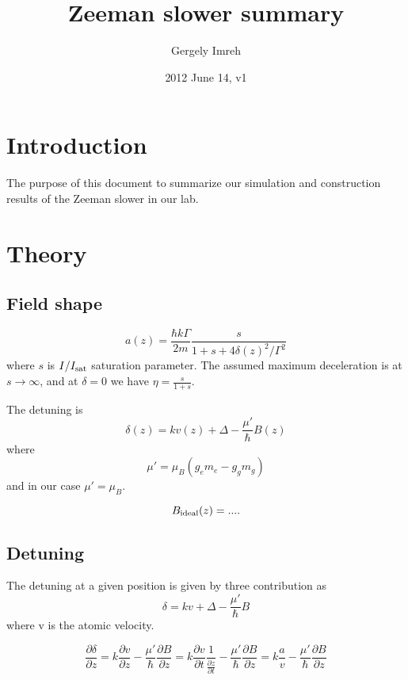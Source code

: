 \documentclass[12pt,a4paper]{article}
\author{Gergely Imreh}
\title{Zeeman slower summary}
\date{2012 June 14, v1}
\begin{document}
\maketitle

\section{Introduction}

The purpose of this document to summarize our simulation and construction results of the Zeeman slower in our lab.

\section{Theory}

\subsection{Field shape}

\begin{equation}
a(z) = \frac{\hbar k \Gamma}{2 m} \frac{s}{1 + s + 4 \delta(z)^2 / \Gamma^2}
\label{eq:accel}
\end{equation}
where $s$ is $I/I_{\rm sat}$ saturation parameter. The assumed maximum deceleration is at $s \rightarrow \infty$, and at $\delta = 0$ we have $\eta = \frac{s}{1 + s}$.

The detuning is 
\begin{equation}
\delta(z) = k v(z) + \Delta - \frac{\mu'}{\hbar} B(z)
\end{equation}
where 
\begin{equation}
\mu' = \mu_{B}(g_e m_e - g_g m_g)
\end{equation}
and in our case $\mu' = \mu_{B}$.

\begin{equation}
B_{\rm ideal}(z) = ....
\end{equation}

\subsection{Detuning}

The detuning at a given position is given by three contribution as
\begin{equation}
\delta = k v + \Delta - \frac{\mu'}{\hbar} B
\end{equation}
where v is the atomic velocity.

\begin{equation}
\frac{\partial \delta}{\partial z} = k \frac{\partial v}{\partial z} - \frac{\mu'}{\hbar}\frac{\partial B}{\partial z} = k \frac{\partial v}{\partial t} \frac{1} {\frac{\partial z}{\partial t}} - \frac{\mu'}{\hbar}\frac{\partial B}{\partial z}
= k \frac {a}{v} - \frac{\mu'}{\hbar}\frac{\partial B}{\partial z}
\end{equation}
\end{document}
